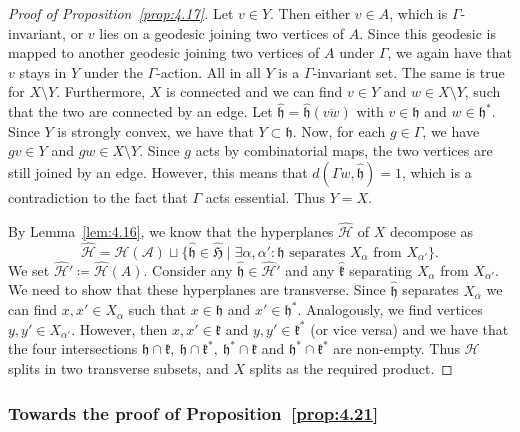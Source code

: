 \begin{proof}[Proof of Proposition~\ref{prop:4.17}]
  Let \(v \in Y\). Then either \(v \in A\), which is \(\Gamma\)-invariant, or \(v\) lies on a geodesic joining two vertices of \(A\). Since this geodesic is mapped to another geodesic joining two vertices of \(A\) under \(\Gamma\), we again have that \(v\) stays in \(Y\) under the \(\Gamma\)-action. All in all \(Y\) is a \(\Gamma\)-invariant set. The same is true for \(X \setminus Y\). Furthermore, \(X\) is connected and we can find \(v \in Y\) and \(w \in X \setminus Y\), such that the two are connected by an edge. Let \(\mathfrak{\hat h} = \mathfrak{\hat h}(\overline{vw})\) with \(v \in \mathfrak{h}\) and \(w \in \mathfrak{h}^\ast\). Since \(Y\) is strongly convex, we have that \(Y \subset \mathfrak{h}\). Now, for each \(g \in \Gamma\), we have \(gv \in Y\) and \(gw \in X \setminus Y\). Since \(g\) acts by combinatorial maps, the two vertices are still joined by an edge. However, this means that \(d(\Gamma w, \mathfrak{\hat h}) = 1\), which is a contradiction to the fact that \(\Gamma\) acts essential. Thus \(Y = X\).

  By Lemma~\ref{lem:4.16}, we know that the hyperplanes \(\mathcal{\hat H}\) of \(X\) decompose as
  \[
    \mathcal{\hat H} = \mathcal{\hat H(A)} \sqcup \{\mathfrak{\hat h} \in \mathfrak{\hat H} \mid \exists \alpha, \alpha'\colon \mathfrak{h} \text{ separates } X_\alpha  \text{ from } X_{\alpha'}\}.
  \]
  We set \(\mathcal{\hat H'} \coloneqq \mathcal{\hat H}(A)\). Consider any \(\mathfrak{\hat h} \in \mathcal{\hat H'}\) and any \(\mathfrak{\hat k}\) separating \(X_\alpha\) from \(X_{\alpha'}\). We need to show that these hyperplanes are transverse. Since \(\mathfrak{\hat h}\) separates \(X_\alpha\) we can find \(x, x' \in X_\alpha\) such that \(x \in \mathfrak{h}\) and \(x' \in \mathfrak{h}^\ast\). Analogously, we find vertices \(y,y' \in X_{\alpha'}\). However, then \(x,x' \in \mathfrak{k}\) and \(y,y' \in \mathfrak{k}^\ast\) (or vice versa) and we have that the four intersections \(\mathfrak{h} \cap \mathfrak{k},\ \mathfrak{h} \cap \mathfrak{k}^\ast,\ \mathfrak{h}^\ast \cap \mathfrak{k}\) and \(\mathfrak{h}^\ast \cap \mathfrak{k}^\ast\) are non-empty. Thus \(\mathcal{H}\) splits in two transverse subsets, and \(X\) splits as the required product.
\end{proof}

\subsubsection*{Towards the proof of Proposition~\ref{prop:4.21}}

